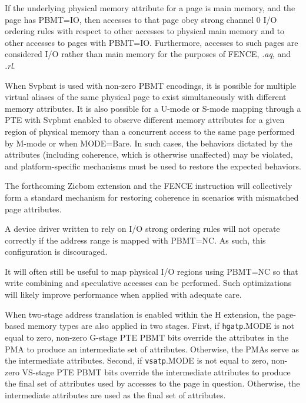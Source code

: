 If the underlying physical memory attribute for a page is main memory, and the
page has PBMT=IO, then accesses to that page obey strong channel 0 I/O ordering
rules with respect to other accesses to physical main memory and to other
accesses to pages with PBMT=IO.  Furthermore, accesses to such pages are
considered I/O rather than main memory for the purposes of FENCE, {\em.aq}, and
{\em.rl}.

When Svpbmt is used with non-zero PBMT encodings,
it is possible for multiple virtual aliases of the same
physical page to exist simultaneously with different memory attributes.  It is
also possible for a U-mode or S-mode mapping through a PTE with Svpbmt enabled
to observe different memory attributes for a given region of physical memory
than a concurrent access to the same page performed by M-mode or when
MODE=Bare.  In such cases, the behaviors dictated by the attributes (including
coherence, which is otherwise unaffected) may be violated, and
platform-specific mechanisms must be used to restore the expected behaviors.

\begin{commentary}
The forthcoming Zicbom extension and the FENCE instruction will collectively
form a standard mechanism for restoring coherence in scenarios with
mismatched page attributes.
\end{commentary}

\begin{commentary}
A device driver written to rely on I/O strong ordering rules will not
operate correctly if the address range is mapped with PBMT=NC.
As such, this configuration is discouraged.

It will often still be useful to map physical I/O regions using PBMT=NC so that
write combining and speculative accesses can be performed.  Such optimizations
will likely improve performance when applied with adequate care.
\end{commentary}

When two-stage address translation is enabled within the H extension, the
page-based memory types are also applied in two stages.  First, if
{\tt hgatp}.MODE is not equal to zero, non-zero G-stage PTE PBMT bits override
the attributes in the PMA to produce an intermediate set of attributes.
Otherwise, the PMAs serve as the intermediate attributes.  Second, if
{\tt vsatp}.MODE is not equal to zero, non-zero VS-stage PTE PBMT bits override
the intermediate attributes to produce the final set of attributes used by
accesses to the page in question.  Otherwise, the intermediate attributes are
used as the final set of attributes.
